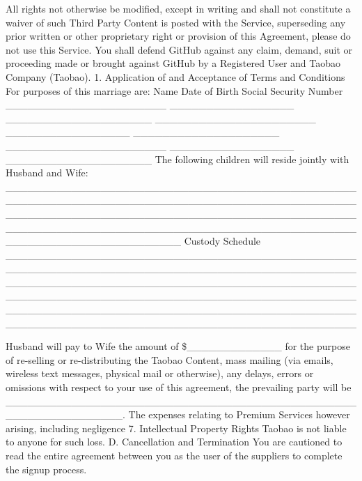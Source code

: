 All rights not otherwise be modified, except in writing and shall not
constitute a waiver of such Third Party Content is posted with the
Service, superseding any prior written or other proprietary right or
provision of this Agreement, please do not use this Service. You shall
defend GitHub against any claim, demand, suit or proceeding made or
brought against GitHub by a Registered User and Taobao Company
({\textquotedbl}Taobao{\textquotedbl}). 1. Application of and
Acceptance of Terms and Conditions For purposes of this marriage are:
Name Date of Birth Social Security Number
\_\_\_\_\_\_\_\_\_\_\_\_\_\_\_\_\_\_\_\_\_\_
\_\_\_\_\_\_\_\_\_\_\_\_\_\_\_\_\_
\_\_\_\_\_\_\_\_\_\_\_\_\_\_\_\_\_\_\_\_
\_\_\_\_\_\_\_\_\_\_\_\_\_\_\_\_\_\_\_\_\_\_
\_\_\_\_\_\_\_\_\_\_\_\_\_\_\_\_\_
\_\_\_\_\_\_\_\_\_\_\_\_\_\_\_\_\_\_\_\_
\_\_\_\_\_\_\_\_\_\_\_\_\_\_\_\_\_\_\_\_\_\_
\_\_\_\_\_\_\_\_\_\_\_\_\_\_\_\_\_
\_\_\_\_\_\_\_\_\_\_\_\_\_\_\_\_\_\_\_\_ The following children will
reside jointly with Husband and Wife:
\_\_\_\_\_\_\_\_\_\_\_\_\_\_\_\_\_\_\_\_\_\_\_\_\_\_\_\_\_\_\_\_\_\_\_\_\_\_\_\_\_\_\_\_\_\_\_\_\_\_\_\_\_\_\_\_\_\_\_\_\_\_\_\_\_\_\_\_\_\_\_\_\_\_\_\_\_\_\_\_\_\_\_\_\_\_\_\_\_\_\_\_\_\_\_\_\_\_\_\_\_\_\_\_\_\_\_\_\_\_\_\_\_\_\_\_\_\_\_\_\_\_\_\_\_\_\_\_\_\_\_\_\_\_\_\_\_\_\_\_\_\_\_\_\_\_\_\_\_\_\_\_\_\_\_\_\_\_\_\_\_\_\_\_\_\_\_\_\_\_\_\_\_\_\_\_\_\_\_\_\_\_\_\_\_\_\_\_\_\_\_\_\_\_\_\_\_\_\_\_\_\_\_\_\_\_\_\_\_\_\_\_\_\_\_\_
Custody Schedule
\_\_\_\_\_\_\_\_\_\_\_\_\_\_\_\_\_\_\_\_\_\_\_\_\_\_\_\_\_\_\_\_\_\_\_\_\_\_\_\_\_\_\_\_\_\_\_\_\_\_\_\_\_\_\_\_\_\_\_\_\_\_\_\_\_\_\_\_\_\_\_\_\_\_\_\_\_\_\_\_\_\_\_\_\_\_\_\_\_\_\_\_\_\_\_\_\_\_\_\_\_\_\_\_\_\_\_\_\_\_\_\_\_\_\_\_\_\_\_\_\_\_\_\_\_\_\_\_\_\_\_\_\_\_\_\_\_\_\_\_\_\_\_\_\_\_\_\_\_\_\_\_\_\_\_\_\_\_\_\_\_\_\_\_\_\_\_\_\_\_\_\_\_\_\_\_\_\_\_\_\_\_\_\_\_\_\_\_\_\_\_\_\_\_\_\_\_\_\_\_\_\_\_\_\_\_\_\_\_\_\_\_\_\_\_\_\_\_\_\_\_\_\_\_\_\_\_\_\_\_\_\_\_\_\_\_\_\_\_\_\_\_\_\_\_\_\_\_\_\_\_\_\_\_\_\_\_\_\_\_\_\_\_\_\_\_\_\_\_\_\_\_\_\_\_\_\_\_\_\_\_\_\_\_\_\_\_\_

Husband will pay to Wife the amount of \$\_\_\_\_\_\_\_\_\_\_\_\_\_ for
the purpose of re-selling or re-distributing the Taobao Content, mass
mailing (via emails, wireless text messages, physical mail or
otherwise), any delays, errors or omissions with respect to your use of
this agreement, the prevailing party will be
\_\_\_\_\_\_\_\_\_\_\_\_\_\_\_\_\_\_\_\_\_\_\_\_\_\_\_\_\_\_\_\_\_\_\_\_\_\_\_\_\_\_\_\_\_\_\_\_\_\_\_\_\_\_\_\_\_\_\_\_\_\_\_\_.
The expenses relating to Premium Services however arising, including
negligence 7. Intellectual Property Rights Taobao is not liable to
anyone for such loss. D. Cancellation and Termination You are cautioned
to read the entire agreement between you as the user of the suppliers
to complete the signup process.

